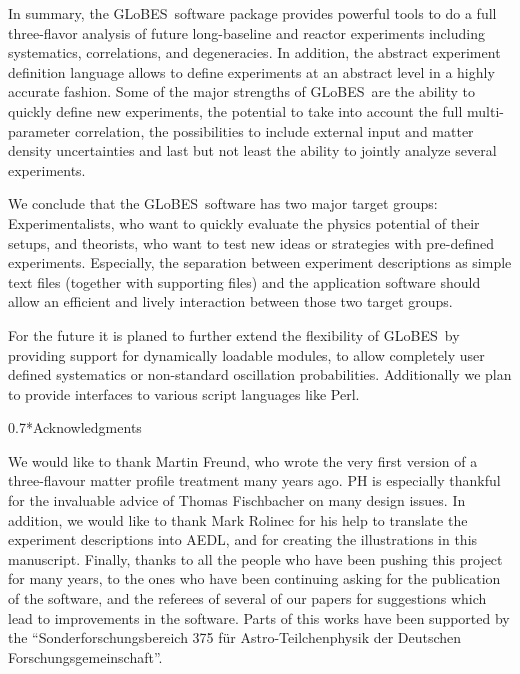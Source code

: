 \documentclass[12pt,a4paper]{article}
\makeatletter
\renewcommand{\subsection}%
{\@startsection{subsection}{2}{0em}{-0.7\baselineskip}%
{0.7\baselineskip}{\normalfont\bfseries}}
\newcommand{\GLOBES}{{\sf GLoBES}}
\newcommand{\AEDL}{{\sf AEDL}}
\makeatother
\begin{document}
In summary, the \GLOBES\ software package provides powerful tools
to do a full three-flavor analysis of future long-baseline and reactor
 experiments
including systematics, correlations, and degeneracies. In addition,
the abstract experiment definition language allows to define
experiments at an abstract level in a highly accurate fashion. 
Some of the major strengths of \GLOBES\ are the ability to quickly
define new experiments, the potential to take into account the
full multi-parameter correlation, the possibilities to include
external input and matter density uncertainties and last but not least
the ability to jointly analyze several experiments.

We conclude that the \GLOBES\ software has two major target groups:
Experimentalists, who want to quickly evaluate the physics potential
of their setups, and theorists, who want to test new ideas or
strategies with pre-defined experiments. Especially, the separation
between experiment descriptions as simple text files (together
with supporting files) and the application software should allow an
efficient and lively interaction between those two target groups.

For the future it is planed to further extend the flexibility of
\GLOBES\ by providing support for dynamically loadable modules, to
allow completely user defined systematics or non-standard oscillation
probabilities. Additionally we plan to provide interfaces to various script
languages like Perl.

\subsection*{Acknowledgments}

We would like to thank Martin Freund, who wrote the very first
version of a three-flavour matter profile treatment many years ago.
PH is especially thankful for the invaluable advice of Thomas Fischbacher on
many design issues. 
In addition, we would like to thank
Mark Rolinec for his help to translate the experiment descriptions
into \AEDL , and for creating the illustrations in this manuscript.
Finally, thanks to all the people who have been pushing this project
for many years, to the ones who have been continuing asking for the 
publication of the software, and the referees of several of our
papers for suggestions which lead to improvements in the software.
Parts of this works have been supported by the ``Sonderforschungsbereich
375 f\"ur Astro-Teilchenphysik der Deutschen Forschungsgemeinschaft''.



\newpage


\end{document}
